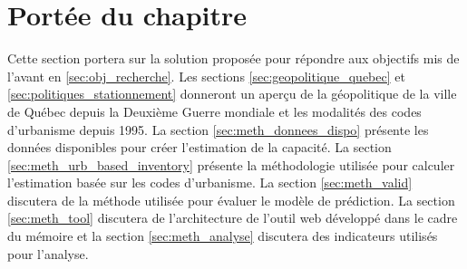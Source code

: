 \label{sec:Methodologie}
\section{Portée du chapitre}
Cette section portera sur la solution proposée pour répondre aux objectifs mis de l'avant en \ref{sec:obj_recherche}. Les sections \ref{sec:geopolitique_quebec} et \ref{sec:politiques_stationnement} donneront un aperçu de la géopolitique de la ville de Québec depuis la Deuxième Guerre mondiale et les modalités des codes d'urbanisme depuis 1995. La section \ref{sec:meth_donnees_dispo} présente les données disponibles pour créer l'estimation de la capacité. La section \ref{sec:meth_urb_based_inventory} présente la méthodologie utilisée pour calculer l'estimation basée sur les codes d'urbanisme. La section \ref{sec:meth_valid} discutera de la méthode utilisée pour évaluer le modèle de prédiction. La section \ref{sec:meth_tool} discutera de l'architecture de l'outil web développé dans le cadre du mémoire et la section \ref{sec:meth_analyse} discutera des indicateurs utilisés pour l'analyse.
